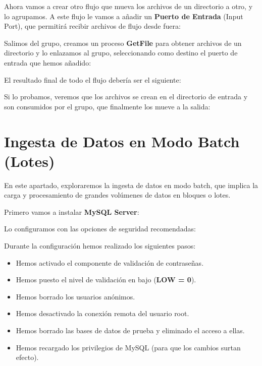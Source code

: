 \documentclass{../../miPlantilla}
\begin{document}
Ahora vamos a crear otro flujo que mueva los archivos de un directorio a otro, y lo agrupamos. A este flujo le vamos a añadir un \textbf{Puerto de Entrada} (Input Port), que permitirá recibir archivos de flujo desde fuera:


Salimos del grupo, creamos un proceso \textbf{GetFile} para obtener archivos de un directorio y lo enlazamos al grupo, seleccionando como destino el puerto de entrada que hemos añadido:


\newpage

El resultado final de todo el flujo debería ser el siguiente:


Si lo probamos, veremos que los archivos se crean en el directorio de entrada y son consumidos por el grupo, que finalmente los mueve a la salida:


\newpage

\section{Ingesta de Datos en Modo Batch (Lotes)}
En este apartado, exploraremos la ingesta de datos en modo batch, que implica la carga y procesamiento de grandes volúmenes de datos en bloques o lotes.

Primero vamos a instalar \textbf{MySQL Server}:


Lo configuramos con las opciones de seguridad recomendadas:


Durante la configuración hemos realizado los siguientes pasos:
\begin{itemize}
    \item Hemos activado el componente de validación de contraseñas.
    \item Hemos puesto el nivel de validación en bajo (\textbf{LOW = 0}).
    \item Hemos borrado los usuarios anónimos.
    \item Hemos desactivado la conexión remota del usuario root.
    \item Hemos borrado las bases de datos de prueba y eliminado el acceso a ellas.
    \item Hemos recargado los privilegios de MySQL (para que los cambios surtan efecto).
\end{itemize}
\end{document}
